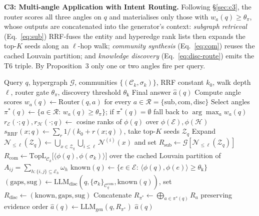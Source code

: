 \documentclass{article}
\begin{document}
\textbf{C3: Multi-angle Application with Intent Routing.} Following \S\ref{sec:c3}, the router scores all three angles on $q$ and materialises only those with $w_a(q)\!\geq\!\theta_{\pi}$, whose outputs are concatenated into the generator's context: \emph{subgraph retrieval} (Eq.~\eqref{eq:sub}) RRF-fuses the entity and hyperedge rank lists then expands the top-$K$ seeds along an $\ell$-hop walk; \emph{community synthesis} (Eq.~\eqref{eq:com}) reuses the cached Louvain partition; and \emph{knowledge discovery} (Eq.~\eqref{eq:disc-route}) emits the T6 triple. By Proposition~3 only one or two angles fire per query.

\begin{algorithm}[h!t]
\small
\caption{C3 --- Intent Routing and Multi-angle Retrieval-Generation}
\label{alg:kc-c3}
\begin{algorithmic}[1]
\REQUIRE Query $q$, hypergraph $\mathcal{G}$, communities $\{(\mathcal{C}_k,\sigma_k)\}$, RRF constant $k_0$, walk depth $\ell$, router gate $\theta_{\pi}$, discovery threshold $\theta_{\mathrm{k}}$
\ENSURE Final answer $\hat{a}(q)$
\STATE Compute angle scores $w_a(q)\!\leftarrow\!\mathrm{Router}(q,a)$ for every $a\!\in\!\mathcal{R}\!=\!\{\mathrm{sub},\mathrm{com},\mathrm{disc}\}$
\STATE Select angles $\pi^{*}(q)\!\leftarrow\!\{a\!\in\!\mathcal{R}\!:\,w_a(q)\!\geq\!\theta_{\pi}\}$; if $\pi^{*}(q)\!=\!\emptyset$ fall back to $\arg\max_a w_a(q)$
    \STATE $r_{\mathcal{E}}(\cdot;q),r_{\mathcal{H}}(\cdot;q)\!\leftarrow\!$ cosine ranks of $\phi(q)$ over $\phi(\mathcal{E}),\phi(\mathcal{H})$
    \STATE $s_{\mathrm{RRF}}(x;q)\!\leftarrow\!\sum_{r}\!1/(k_0\!+\!r(x;q))$, take top-$K$ seeds $\mathcal{Z}_q$
    \STATE Expand $\mathcal{N}_{\leq\ell}(\mathcal{Z}_q)\!\leftarrow\!\bigcup_{x\in\mathcal{Z}_q}\!\bigcup_{i\leq\ell}\!\mathcal{N}^{(i)}(x)$ and set $R_{\mathrm{sub}}\!\leftarrow\!\mathcal{G}[\mathcal{N}_{\leq\ell}(\mathcal{Z}_q)]$ \hfill {}
\ENDIF
{}
    \STATE $R_{\mathrm{com}}\!\leftarrow\!\mathrm{TopL}_{\mathcal{C}_k}\!\bigl[\langle\phi(q),\phi(\sigma_k)\rangle\bigr]$ over the cached Louvain partition of $A_{ij}\!=\!\sum_{h:\{i,j\}\subseteq\mathcal{E}_h}\!\omega_h$
\ENDIF
{}
    \STATE $\mathrm{known}(q)\!\leftarrow\!\{e\!\in\!\mathcal{E}\!:\,\langle\phi(q),\phi(e)\rangle\!\geq\!\theta_{\mathrm{k}}\}$
    \STATE $(\mathrm{gaps},\mathrm{sug})\!\leftarrow\!\mathrm{LLM}_{\mathrm{disc}}(q,\{\sigma_k\}_{\mathcal{C}_q^{\mathrm{com}}},\mathrm{known}(q))$, set $R_{\mathrm{disc}}\!\leftarrow\!(\mathrm{known},\mathrm{gaps},\mathrm{sug})$ \hfill {}
\ENDIF
\STATE Concatenate $R_{\pi^{*}}\!\leftarrow\!\bigoplus_{a\in\pi^{*}(q)}\!R_a$ preserving evidence order
\STATE $\hat{a}(q)\!\leftarrow\!\mathrm{LLM}_{\mathrm{gen}}(q,R_{\pi^{*}})$
\RETURN $\hat{a}(q)$
\end{algorithmic}
\end{algorithm}
\end{document}
